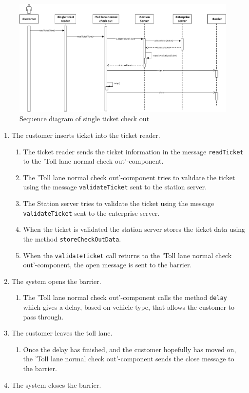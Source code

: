 \begin{figure}[H]
\centerline{\includegraphics[width=1.4\columnwidth]{img/sequence_diagrams/sequence_diagram_single_ticket_check_out}}
\caption{Sequence diagram of single ticket check out}
\label{fig:seq_check_out_single_ticket}
\end{figure}

\begin{enumerate}
\item The customer inserts ticket into the ticket reader.
\begin{enumerate}
\item The ticket reader sends the ticket information in the message \texttt{readTicket} to the 'Toll lane normal check out'-component.
\item The 'Toll lane normal check out'-component tries to validate the ticket using the message \texttt{validateTicket} sent to the station server.
\item The Station server tries to validate the ticket using the message \texttt{validateTicket} sent to the enterprise server.
\item When the ticket is validated the station server stores the ticket data using the method \texttt{storeCheckOutData}.
\item When the \texttt{validateTicket} call returns to the 'Toll lane normal check out'-component, the open message is sent to the barrier.
\end{enumerate}
\item The system opens the  barrier.
\begin{enumerate}
\item The 'Toll lane normal check out'-component calls the method \texttt{delay} which gives a delay, based on vehicle type, that allows the customer to pass through.
\end{enumerate}
\item The customer leaves the toll lane.
\begin{enumerate}
\item Once the delay has finished, and the customer hopefully has moved on, the 'Toll lane normal check out'-component sends the close message to the barrier.
\end{enumerate}
\item The system closes the barrier.

\end{enumerate}
